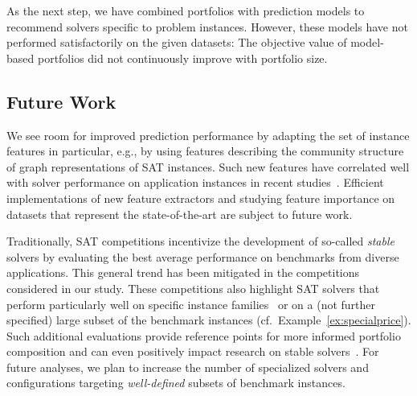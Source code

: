 \documentclass[a4paper,USenglish,pdfa]{lipics-v2021} %
\begin{document}
As the next step, we have combined portfolios with prediction models to recommend solvers specific to problem instances.
However, these models have not performed satisfactorily on the given datasets:
The objective value of model-based portfolios did not continuously improve with portfolio size.

\subsection{Future Work}

We see room for improved prediction performance by adapting the set of instance features in particular,
e.g., by using features describing the community structure of graph representations of SAT instances.
Such new features have correlated well with solver performance on application instances in recent studies~\cite{Ansotegui:2009:StructureIndustrial,Ansotegui:2017:StructureFeatures,Ansotegui:2019:CommunityStructure,Li:2021:HCS}. 
Efficient implementations of new feature extractors and studying feature importance on datasets that represent the state-of-the-art are subject to future work. 

Traditionally, SAT competitions incentivize the development of so-called \emph{stable} solvers by evaluating the best average performance on benchmarks from diverse applications.
This general trend has been mitigated in the competitions considered in our study.
These competitions also highlight SAT solvers that perform particularly well on specific instance families~\cite{SC2020:AIJ} or on a (not further specified) large subset of the benchmark instances (cf.~Example~\ref{ex:specialprice}).
Such additional evaluations provide reference points for more informed portfolio composition and can even positively impact research on stable solvers~\cite{Fleury:2021:AllUip}.
For future analyses, we plan to increase the number of specialized solvers and configurations targeting \emph{well-defined} subsets of benchmark instances.


\end{document}
